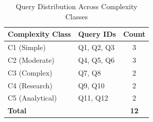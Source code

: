 \begin{table}[htbp]
\centering
\caption{Query Distribution Across Complexity Classes}
\label{tab:query_distribution}
\begin{tabular}{|l|l|c|}
\hline
\textbf{Complexity Class} & \textbf{Query IDs} & \textbf{Count} \\
\hline
C1 (Simple) & Q1, Q2, Q3 & 3 \\
C2 (Moderate) & Q4, Q5, Q6 & 3 \\
C3 (Complex) & Q7, Q8 & 2 \\
C4 (Research) & Q9, Q10 & 2 \\
C5 (Analytical) & Q11, Q12 & 2 \\
\hline
\textbf{Total} & & \textbf{12} \\
\hline
\end{tabular}
\end{table}
